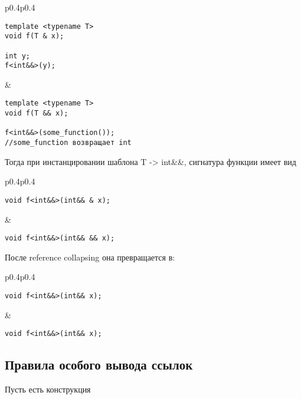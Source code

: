 \begin{center}

\begin{tabular}{p{0.4\linewidth}p{0.4\linewidth}}
\begin{verbatim}
template <typename T>
void f(T & x);

int y;
f<int&&>(y);
\end{verbatim}
&
\begin{verbatim}
template <typename T>
void f(T && x);

f<int&&>(some_function());
//some_function возвращает int
\end{verbatim}
\end{tabular}

Тогда при инстанцировании шаблона T -> int\&\&, сигнатура функции имеет вид

\begin{tabular}{p{0.4\linewidth}p{0.4\linewidth}}
\begin{verbatim}
void f<int&&>(int&& & x);
\end{verbatim}
&
\begin{verbatim}
void f<int&&>(int&& && x);
\end{verbatim}
\end{tabular}

После reference collapsing она превращается в:

\begin{tabular}{p{0.4\linewidth}p{0.4\linewidth}}
\begin{verbatim}
void f<int&&>(int&& x);
\end{verbatim}
&
\begin{verbatim}
void f<int&&>(int&& x);
\end{verbatim}
\end{tabular}
\end{center}

\subsection{Правила особого вывода ссылок}

Пусть есть конструкция

